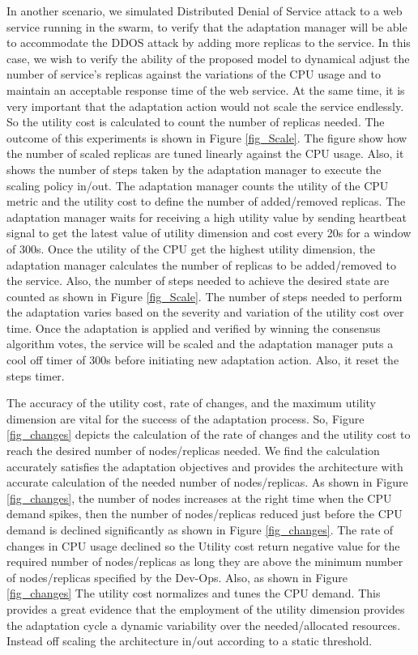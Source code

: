\documentclass{ieeeaccess}
\begin{document}
 

 

In another scenario, we simulated Distributed Denial of Service attack to a web service running in the swarm, to verify that the adaptation manager will be able to accommodate the DDOS attack by adding more replicas to the service. In this case, we wish to verify the ability of the proposed model to dynamical adjust the number of service's replicas against the variations of the CPU usage and to maintain an acceptable response time of the web service. At the same time, it is very important that the adaptation action would not scale the service endlessly. So the utility cost is calculated to count the number of replicas needed. The outcome of this experiments is shown in Figure \ref{fig_Scale}. The figure show how the number of scaled replicas are tuned linearly against the CPU usage. Also, it shows the number of steps taken by the adaptation manager to execute the scaling policy in/out. The adaptation manager counts the utility of the CPU metric and the utility cost to define the number of added/removed replicas. The adaptation manager waits for receiving a high utility value by sending heartbeat signal to get the latest value of utility dimension and cost every 20s for a window of 300s. Once the utility of the CPU get the highest utility dimension, the adaptation manager calculates the number of replicas to be added/removed to the service. Also, the number of steps needed to achieve the desired state are counted as shown in Figure \ref{fig_Scale}. The number of steps needed to perform the adaptation varies based on the severity and variation of the utility cost over time. Once the adaptation is applied and verified by winning the consensus algorithm votes, the service will be scaled and the adaptation manager puts a cool off timer of 300s before initiating new adaptation action. Also, it reset the steps timer. 

The accuracy of the utility cost, rate of changes, and the maximum utility dimension are vital for the success of the adaptation process. So, Figure \ref{fig_changes} depicts the calculation of the rate of changes and the utility cost to reach the desired number of nodes/replicas needed. We find the calculation accurately satisfies the adaptation objectives and provides the architecture with accurate calculation of the needed number of nodes/replicas. As shown in Figure \ref{fig_changes}, the number of nodes increases at the right time when the CPU demand spikes, then the number of nodes/replicas reduced just before the CPU demand is declined significantly as shown in Figure \ref{fig_changes}. The rate of changes in CPU usage declined so the Utility cost return negative value for the required number of nodes/replicas as long they are above the minimum number of nodes/replicas specified by the Dev-Ops. Also, as shown in Figure \ref{fig_changes} The utility cost normalizes and tunes the CPU demand. This provides a great evidence that the employment of the utility dimension provides the adaptation cycle a dynamic variability over the needed/allocated resources. Instead off scaling the architecture in/out according to a static threshold. 
\end{document}
